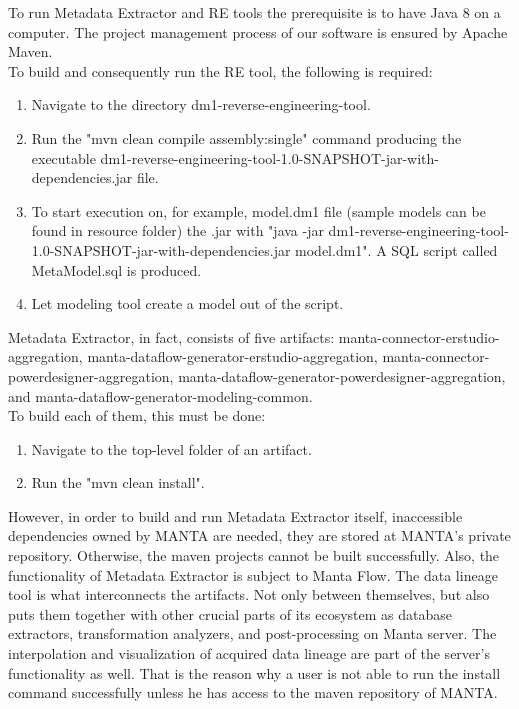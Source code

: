 \documentclass[12pt,a4paper]{report}
\begin{document}
To run Metadata Extractor and RE tools the prerequisite is to have Java 8 on a computer. The project management process of our software is ensured by Apache Maven. \\

To build and consequently run the RE tool, the following is required:
\begin{enumerate}
	\item Navigate to the directory dm1-reverse-engineering-tool.
	\item Run the "mvn clean compile assembly:single" command producing the executable dm1-reverse-engineering-tool-1.0-SNAPSHOT-jar-with-dependencies.jar file.
	\item To start execution on, for example, model.dm1 file (sample models can be found in resource folder) the .jar with "java -jar dm1-reverse-engineering-tool-1.0-SNAPSHOT-jar-with-dependencies.jar model.dm1". A SQL script called MetaModel.sql is produced.
	\item Let modeling tool create a model out of the script.
\end{enumerate}

Metadata Extractor, in fact, consists of five artifacts: manta-connector-erstudio-aggregation, manta-dataflow-generator-erstudio-aggregation, manta-connector-powerdesigner-aggregation, manta-dataflow-generator-powerdesigner-aggregation, and manta-dataflow-generator-modeling-common. \\
To build each of them, this must be done:
\begin{enumerate}
	\item Navigate to the top-level folder of an artifact.
	\item Run the "mvn clean install".
\end{enumerate}

However, in order to build and run Metadata Extractor itself, inaccessible dependencies owned by MANTA are needed, they are stored at MANTA's private repository. Otherwise, the maven projects cannot be built successfully.
Also, the functionality of Metadata Extractor is subject to Manta Flow. The data lineage tool is what interconnects the artifacts. 
Not only between themselves, but also puts them together with other crucial parts of its ecosystem as database extractors, transformation analyzers, and post-processing on Manta server. 
The interpolation and visualization of acquired data lineage are part of the server's functionality as well.
That is the reason why a user is not able to run the install command successfully unless he has access to the maven repository of MANTA. \\
\end{document}

